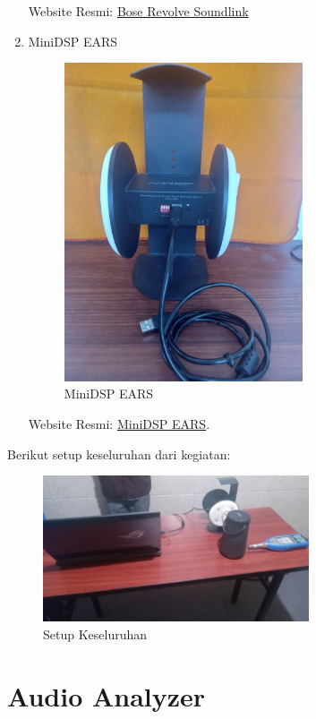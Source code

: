 \documentclass[12pt]{book}
\begin{document}
\begin{enumerate}
		Website Resmi: \href{https://www.bose.com/en_us/products/speakers/portable_speakers/soundlink-revolve-ii.html}{Bose Revolve Soundlink}

		\newpage
		\item MiniDSP EARS
		\begin{figure}[!ht]
			\centering
			\includegraphics[width=200pt,angle=-90]{images/perangkat/ears}
			\caption{MiniDSP EARS}
		\end{figure}

		Website Resmi: \href{https://www.minidsp.com/products/acoustic-measurement/ears-headphone-jig}{MiniDSP EARS}.
	\end{enumerate}

	Berikut setup keseluruhan dari kegiatan:

	\begin{figure}[!ht]
		\centering
		\includegraphics[width=0.7\textwidth]{images/perangkat/setup}
		\caption{Setup Keseluruhan}
	\end{figure}

	\section{Audio Analyzer}
\end{document}
